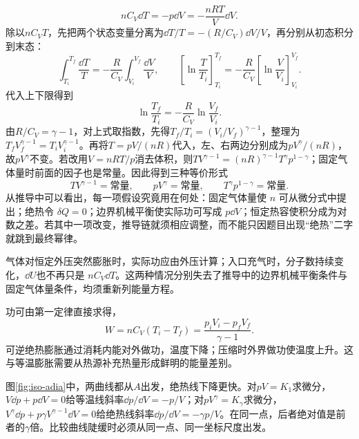 \[nC_V\dd T=-p\dd V=-\frac{nRT}{V}\dd V.
\]
除以$nC_VT$，先把两个状态变量分离为$\dd T/T=-(R/C_V)\dd V/V$，再分别从初态积分到末态：
\[
\int_{T_i}^{T_f}\frac{\dd T}{T}
=-\frac R{C_V}\int_{V_i}^{V_f}\frac{\dd V}{V},\qquad
\left[\ln\frac T{T_i}\right]_{T_i}^{T_f}
=-\frac R{C_V}\left[\ln\frac V{V_i}\right]_{V_i}^{V_f}.
\]
代入上下限得到
\[\ln\frac{T_f}{T_i}=-\frac R{C_V}\ln\frac{V_f}{V_i}.
\]
由$R/C_V=\gamma-1$，对上式取指数，先得$T_f/T_i=(V_i/V_f)^{\gamma-1}$，整理为$T_fV_f^{\gamma-1}=T_iV_i^{\gamma-1}$。再将$T=pV/(nR)$代入，左、右两边分别成为$pV^\gamma/(nR)$，故$pV^\gamma$不变。若改用$V=nRT/p$消去体积，则$TV^{\gamma-1}=(nR)^{\gamma-1}T^\gamma p^{1-\gamma}$；固定气体量时前面的因子也是常量。因此得到三种等价形式
\[\boxed{TV^{\gamma-1}=\text{常量}},\qquad
\boxed{pV^\gamma=\text{常量}},\qquad
\boxed{T^\gamma p^{1-\gamma}=\text{常量}}.
\]
从推导中可以看出，每一项假设究竟用在何处：固定气体量使 $n$ 可从微分式中提出；绝热令 $\delta Q=0$；边界机械平衡使实际功可写成 $p\dd V$；恒定热容使积分成为对数之差。若其中一项改变，推导链就须相应调整，而不能只因题目出现“绝热”二字就跳到最终幂律。

气体对恒定外压突然膨胀时，实际功应由外压计算；入口充气时，分子数持续变化，$\dd U$也不再只是 $nC_V\dd T$。这两种情况分别失去了推导中的边界机械平衡条件与固定气体量条件，均须重新列能量方程。

功可由第一定律直接求得，
\[\boxed{W=nC_V(T_i-T_f)=\frac{p_iV_i-p_fV_f}{\gamma-1}}.
\]
可逆绝热膨胀通过消耗内能对外做功，温度下降；压缩时外界做功使温度上升。这与等温膨胀需要从热源补充热量形成鲜明的能量差别。


图\ref{fig:iso-adia}中，两曲线都从$A$出发，绝热线下降更快。对$pV=K_1$求微分，$V\dd p+p\dd V=0$给等温线斜率$\dd p/\dd V=-p/V$；对$pV^\gamma=K_\gamma$求微分，$V^\gamma\dd p+p\gamma V^{\gamma-1}\dd V=0$给绝热线斜率$\dd p/\dd V=-\gamma p/V$。在同一点，后者绝对值是前者的$\gamma$倍。比较曲线陡缓时必须从同一点、同一坐标尺度出发。

